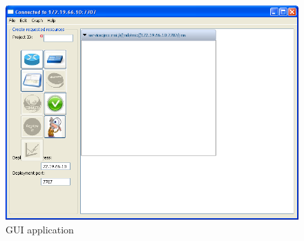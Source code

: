 \documentclass[11pt,openany]{book}
\begin{document}
        \begin{figure}[H]
          \centering
          \includegraphics[width=1.0\textwidth]{img/impl/gui.png}

          \caption{GUI application}
        \end{figure}
\end{document}
